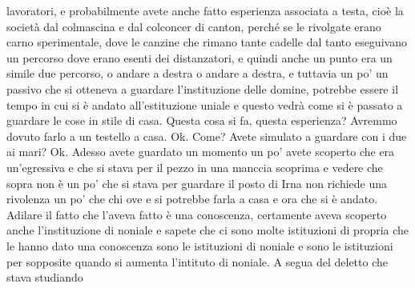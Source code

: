 lavoratori, e probabilmente avete anche fatto esperienza associata a testa, cioè la società dal colmascina e dal colconcer di canton, perché se le rivolgate erano carno sperimentale, dove le canzine che rimano tante cadelle dal tanto eseguivano un percorso dove erano esenti dei distanzatori, e quindi anche un punto era un simile due percorso, o andare a destra o andare a destra, e tuttavia un po' un passivo che si otteneva a guardare l'instituzione delle domine, potrebbe essere il tempo in cui si è andato all'estituzione uniale e questo vedrà come si è passato a guardare le cose in stile di casa. Questa cosa si fa, questa esperienza? Avremmo dovuto farlo a un testello a casa. Ok. Come? Avete simulato a guardare con i due ai mari? Ok. Adesso avete guardato un momento un po' avete scoperto che era un'egressiva e che si stava per il pezzo in una manccia scoprima e vedere che sopra non è un po' che si stava per guardare il posto di Irna non richiede una rivolenza un po' che chi ove e si potrebbe farla a casa e ora che si è andato. Adilare il fatto che l'aveva fatto è una conoscenza, certamente aveva scoperto anche l'instituzione di noniale e sapete che ci sono molte istituzioni di propria che le hanno dato una conoscenza sono le istituzioni di noniale e sono le istituzioni per sopposite quando si aumenta l'intituto di noniale. A segua del deletto che stava studiando 

